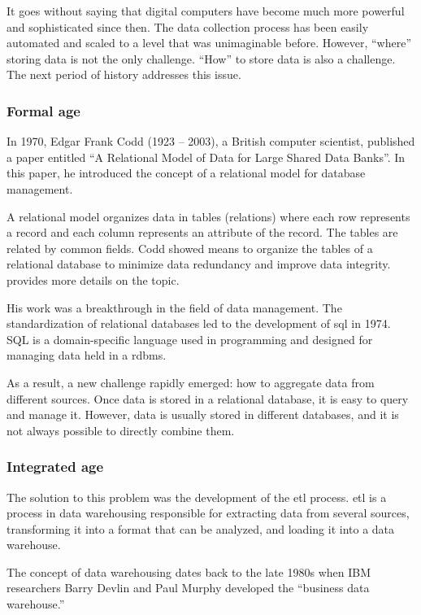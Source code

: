 It goes without saying that digital computers have become much more powerful and
sophisticated since then.  The data collection process has been easily automated and
scaled to a level that was unimaginable before.  However, ``where'' storing data is
not the only challenge.  ``How'' to store data is also a challenge.  The next period of
history addresses this issue.

\subsubsection{Formal age}

In 1970, Edgar Frank Codd (1923 -- 2003), a British computer scientist,
published a paper entitled ``A Relational Model
of Data for Large Shared Data Banks''.  In this paper, he introduced
the concept of a relational model for database management.

A relational model organizes data in tables (relations) where each row represents a record
and each column represents an attribute of the record.  The tables are related by common
fields.  Codd showed means to organize the tables of a relational database to minimize
data redundancy and improve data integrity.   provides more details
on the topic.

His work was a breakthrough in the field of data management.  The standardization of
relational databases led to the development of \gls{sql} in 1974.
SQL is a domain-specific language used in programming and designed for managing data held
in a \gls{rdbms}.

As a result, a new challenge rapidly emerged: how to aggregate data from different
sources. Once data is stored in a relational database, it is easy to query and manage
it. However, data is usually stored in different databases, and it is not always possible
to directly combine them.

\subsubsection{Integrated age}

The solution to this problem was the development of the \gls{etl}
process.  \gls{etl} is a process in data warehousing responsible for extracting data from
several sources, transforming it into a format that can be analyzed, and loading it into a
data warehouse.

The concept of data warehousing dates back to the late 1980s when IBM researchers Barry
Devlin and Paul Murphy developed the ``business data warehouse.''


